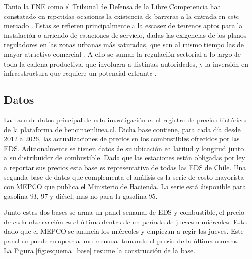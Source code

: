Tanto la FNE como el Tribunal de Defensa de la Libre Competencia han constatado en repetidas ocasiones la existencia de barreras a la entrada en este mercado \parencite{TDLC2012}. Estas se refieren principalmente a la escasez de terrenos aptos para la instalación o arriendo de estaciones de servicio, dadas las exigencias de los planos reguladores en las zonas urbanas más saturadas, que son al mismo tiempo las de mayor atractivo comercial \parencite{FNE2021informe}. A ello se suman la regulación sectorial a lo largo de toda la cadena productiva, que involucra a distintas autoridades, y la inversión en infraestructura que requiere un potencial entrante \parencite{FNE2025informe}.

\subsection{Datos}

La base de datos principal de esta investigación es el registro de precios históricos de la plataforma de bencinaenlinea.cl. Dicha base contiene, para cada día desde 2012 a 2026, las actualizaciones de precios en los combustibles ofrecidos por las EDS. Adicionalmente se tienen datos de su ubicación en latitud y longitud junto a su distribuidor de combustible. Dado que las estaciones están obligadas por ley a reportar sus precios esta base es representativa de todas las EDS de Chile. Una segunda base de datos que complementa el análisis es la serie de costo mayorista con MEPCO que publica el Ministerio de Hacienda. La serie está disponible para gasolina 93, 97 y diésel, más no para la gasolina 95.

Junto estas dos bases se arma un panel semanal de EDS y combustible, el precio de cada observación es el último dentro de un período de jueves a miércoles. Esto dado que el MEPCO se anuncia los miércoles y empiezan a regir los jueves. Este panel se puede colapsar a uno mensual tomando el precio de la última semana. La Figura \ref{fig:esquema_base} resume la construcción de la base.


